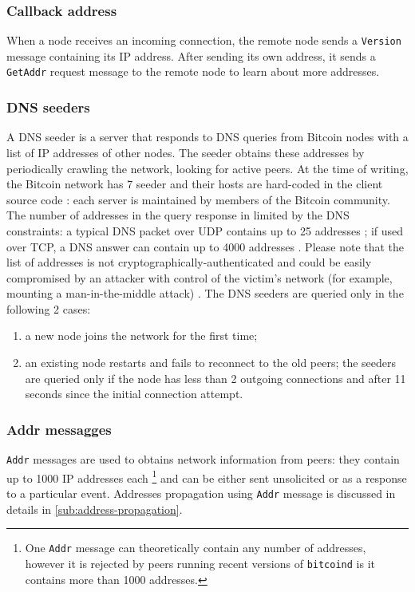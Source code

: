 \subsubsection{Callback address}
When a node receives an incoming connection, the remote node sends a \texttt{Version} message containing its IP address.
After sending its own address, it sends a \texttt{GetAddr} request message to the remote node to learn about more addresses.

\subsubsection{DNS seeders}
A DNS seeder is a server that responds to \ac{DNS} queries from Bitcoin nodes with a list of IP addresses of other nodes.
The seeder obtains these addresses by periodically crawling the network, looking for active peers.
At the time of writing, the Bitcoin network has \num{7} seeder and their hosts are hard-coded in the client source code \cite{bitcoin_dns}:
each server is maintained by members of the Bitcoin community.
The number of addresses in the query response in limited by the \ac{DNS} constraints:
a typical \ac{DNS} packet over UDP contains up to \num{25} addresses \cite{dns_stackoverflow};
if used over TCP, a \ac{DNS} answer can contain up to \num{4000} addresses \cite{dns_4000}.
Please note that the list of addresses is not cryptographically-authenticated and could be easily compromised by an attacker with control of the victim's network (for example, mounting a man-in-the-middle attack) \cite{bitcoin_guide}.
The DNS seeders are queried only in the following \num{2} cases:
\begin{enumerate}
	\item a new node joins the network for the first time;
	\item an existing node restarts and fails to reconnect to the old peers; the seeders are queried only if the node has less than \num{2} outgoing connections and after \num{11} seconds since the initial connection attempt.
\end{enumerate}

\subsubsection{Addr messagges}
\texttt{Addr} messages are used to obtains network information from peers:
they contain up to \num{1000} IP addresses each \footnote{One \texttt{Addr} message can theoretically contain any number of addresses, however it is rejected by peers running recent versions of \texttt{bitcoind} is it contains more than \num{1000} addresses.} and can be either sent unsolicited or as a response to a particular event.
Addresses propagation using \texttt{Addr} message is discussed in details in \cref{sub:address-propagation}.

